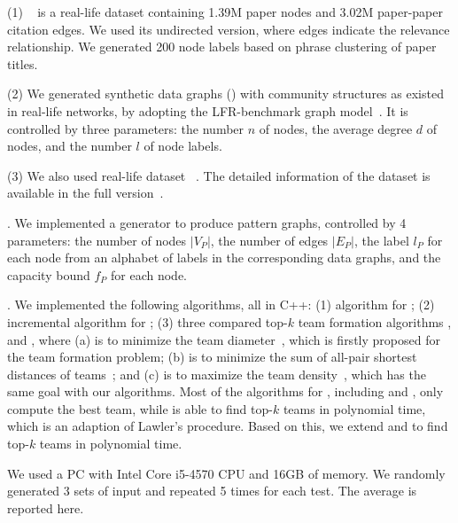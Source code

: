 \ni (1) {\em \citationd}~\cite{citationWeb} is a real-life dataset containing 1.39M paper nodes and 3.02M paper-paper citation edges.
We used its undirected version, where edges indicate the relevance relationship. We generated 200 node labels based on phrase clustering of paper titles.


\ni (2) We generated synthetic data graphs (\synthetic) with community structures as existed in real-life networks, by adopting the LFR-benchmark graph model~\cite{AndreaSF08}. It is controlled by three parameters: the number $n$ of nodes, the average degree $d$ of nodes, and the number $l$ of node labels.

\ni (3) We also used real-life dataset \youtube~\cite{youtubeWeb}. The detailed information of the dataset is available in the full version~\cite{fullvldb18}. 

.
We implemented a generator to produce pattern graphs, controlled by 4 parameters:
the number of nodes $|V_P|$, the number of edges $|E_P|$, the label $l_{P}$ for each node from
an alphabet of labels in the corresponding data graphs,
and the capacity bound $f_{P}$ for each node.

. We implemented the following algorithms, all in C++:
(1) algorithm \optgrouprec for \teamF; (2) incremental algorithm \inc for \dynteamF;
(3) three compared top-$k$ team formation algorithms \mindia, \minsumdis and \denalk, where
(a) \mindia is to minimize the team diameter~\cite{Lappas09}, which is firstly proposed for the team formation problem;
(b) \minsumdis is to minimize the sum of all-pair shortest distances of teams~\cite{Kargar11}; and
(c) \denalk is to maximize the team density~\cite{GajewarS12}, which has the same goal with our algorithms.
Most of the algorithms for \teamF, including  \mindia and \denalk, only compute the best team,
while \minsumdis is able to find top-$k$ teams in polynomial time, which is an adaption of Lawler's procedure.
Based on this, we extend \mindia and \denalk to find top-$k$ teams in polynomial time.

We used a PC with Intel Core i5-4570 CPU and 16GB of memory. We randomly generated 3 sets of input and repeated 5 times for each test. The average is reported here.

